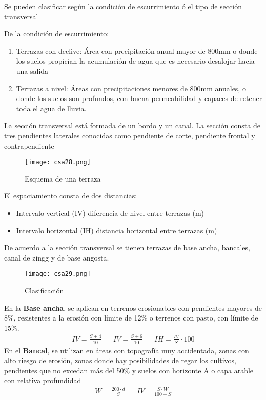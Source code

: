    Se pueden clasificar según la condición de escurrimiento ó el tipo de sección transversal
    
    De la condición de escurrimiento:
    \begin{enumerate}
        \item Terrazas con declive: Área con precipitación anual mayor de 800mm o donde los suelos propician la acumulación de agua que es necesario desalojar hacia una salida
        \item Terrazas a nivel: Áreas con precipitaciones menores de 800mm anuales, o donde los suelos son profundos, con buena permeabilidad y capaces de retener toda el agua de lluvia.
    \end{enumerate}
    La sección transversal está formada de un bordo y un canal. La sección consta de tres pendientes laterales conocidas como pendiente de corte, pendiente frontal y contrapendiente
    \begin{figure}[h!]
    \centering
      \texttt{[image: csa28.png]}
      \caption{Esquema de una terraza}
      \label{csa28}
    \end{figure}
    El espaciamiento consta de dos distancias:
    \begin{itemize}
        \item Intervalo vertical (IV) diferencia de nivel entre terrazas (m)
        \item Intervalo horizontal (IH) distancia horizontal entre terrazas (m)
    \end{itemize}
    De acuerdo a la sección transversal se tienen terrazas de base ancha, bancales, canal de zingg y de base angosta.
    \begin{figure}[h!]
    \centering
      \texttt{[image: csa29.png]}
      \caption{Clasificación}
      \label{csa29}
    \end{figure}
    En la \textbf{Base ancha}, se aplican en terrenos erosionables con pendientes mayores de 8\%, resistentes a la erosión con límite de 12\% o terrenos con pasto, con límite de 15\%.
    \begin{align}
        IV = \frac{S +4}{10}&&IV = \frac{S + 6}{10}&& IH = \frac{IV}{S} \cdot 100
    \end{align}
    En el \textbf{Bancal}, se utilizan en áreas con topografía muy accidentada, zonas con alto riesgo de erosión, zonas donde hay posibilidades de regar los cultivos, pendientes que no excedan más del 50\% y suelos con horizonte A o capa arable con relativa profundidad
    \begin{align}
        W = \frac{200\cdot d}{S}&& IV = \frac{S \cdot W}{100 - S}
    \end{align}
